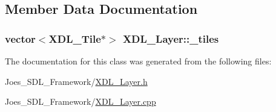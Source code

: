 \subsection{Member Data Documentation}
\hypertarget{class_x_d_l___layer_a7c56eae3df1548d3ab7a63128153c3ed}{
\subsubsection[{\-\_\-tiles}]{\setlength{\rightskip}{0pt plus 5cm}vector$<${\bf X\-D\-L\-\_\-\-Tile}$\ast$$>$ X\-D\-L\-\_\-\-Layer\-::\-\_\-tiles}}\label{class_x_d_l___layer_a7c56eae3df1548d3ab7a63128153c3ed}


The documentation for this class was generated from the following files\-:\begin{DoxyCompactItemize}
\item 
Joes\-\_\-\-S\-D\-L\-\_\-\-Framework/\hyperlink{_x_d_l___layer_8h}{X\-D\-L\-\_\-\-Layer.\-h}\item 
Joes\-\_\-\-S\-D\-L\-\_\-\-Framework/\hyperlink{_x_d_l___layer_8cpp}{X\-D\-L\-\_\-\-Layer.\-cpp}\end{DoxyCompactItemize}
